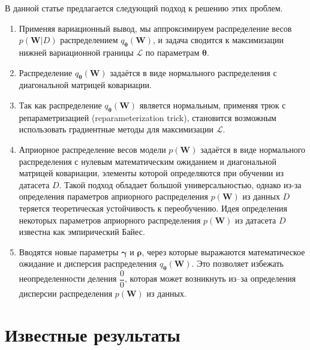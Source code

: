 \documentclass{article}
\numberwithin{equation}{section}
\begin{document}
    В данной статье предлагается следующий подход к решению этих проблем.

    \begin{enumerate}
        \item Применяя вариационный вывод,
            мы аппроксимируем распределение весов $p(\pmb{W}| D)$
            распределением $q_{\pmb{\theta}}(\pmb{W})$,
            и задача сводится к максимизации нижней вариационной границы
            $\mathcal{L}$ по параметрам $\pmb{\theta}$.
        \item Распределение $q_{\pmb{\theta}}(\pmb{W})$
            задаётся в виде нормального распределения с диагональной матрицей ковариации.
        \item Так как распределение $q_{\pmb{\theta}}(\pmb{W})$
            является нормальным, применяя трюк с репараметризацией
            (reparameterization trick),
            становится возможным использовать градиентные методы
            для максимизации $\mathcal{L}$.
        \item Априорное распределение весов модели $p(\pmb{W})$
            задаётся в виде нормального распределения с нулевым математическим ожиданием
            и диагональной матрицей ковариации,
            элементы которой определяются при обучении из датасета $D$.
            Такой подход обладает большой универсальностью,
            однако из-за определения параметров априорного распределения $p(\pmb{W})$
            из данных $D$ теряется теоретическая устойчивость к переобучению.
            Идея определения некоторых параметров априорного распределения
            $p(\pmb{W})$ из датасета $D$
            известна как эмпирический Байес.
        \item Вводятся новые параметры $\pmb{\gamma}$ и $\pmb{\rho}$,
            через которые выражаются математическое ожидание и дисперсия распределения
            $q_{\pmb{\theta}}(\pmb{W})$.
            Это позволяет избежать неопределенности деления $\dfrac{0}{0}$,
            которая может возникнуть из--за определения дисперсии распределения $p(\pmb{W})$ из данных.
    \end{enumerate}

    \section{Известные результаты}
\end{document}
